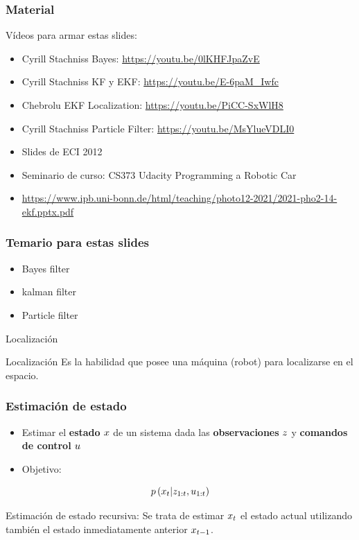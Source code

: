 \begin{frame}
    \frametitle{Material}
    
    Vídeos para armar estas slides:
    \begin{itemize}
        \item Cyrill Stachniss Bayes: \url{https://youtu.be/0lKHFJpaZvE} 
        \item Cyrill Stachniss KF y EKF: \url{https://youtu.be/E-6paM_Iwfc}
        \item Chebrolu EKF Localization: \url{https://youtu.be/PiCC-SxWlH8}
        \item Cyrill Stachniss Particle Filter: \url{https://youtu.be/MsYlueVDLI0}
        \item Slides de ECI 2012
        \item Seminario de curso: CS373 Udacity Programming a Robotic Car
        \item \url{https://www.ipb.uni-bonn.de/html/teaching/photo12-2021/2021-pho2-14-ekf.pptx.pdf}
    \end{itemize}
    
\end{frame}

\begin{frame}
    \frametitle{Temario para estas slides}
    
    \begin{itemize}
        \item Bayes filter
        \item kalman filter
        \item Particle filter
    \end{itemize}
    
\end{frame}

\begin{frame}{Localización}
    \begin{block}{Localización}
        Es la habilidad que posee una máquina (robot) para localizarse en el espacio.
    \end{block}
\end{frame}


\begin{frame}
    \frametitle{Estimación de estado}
    
    
    \begin{itemize}
        \item  Estimar el \textbf{estado} $x$ de un sistema dada las \textbf{observaciones} $z$ y \textbf{comandos de control} $u$
        \item Objetivo:
    \end{itemize}
    
    \begin{equation}
        p\left(x_{t} | z_{1:t}, u_{1:t} \right)
    \end{equation}
    
    Estimación de estado recursiva: Se trata de estimar $x_{t}$ el estado actual utilizando también el estado inmediatamente anterior $x_{t-1}$.
\end{frame}

